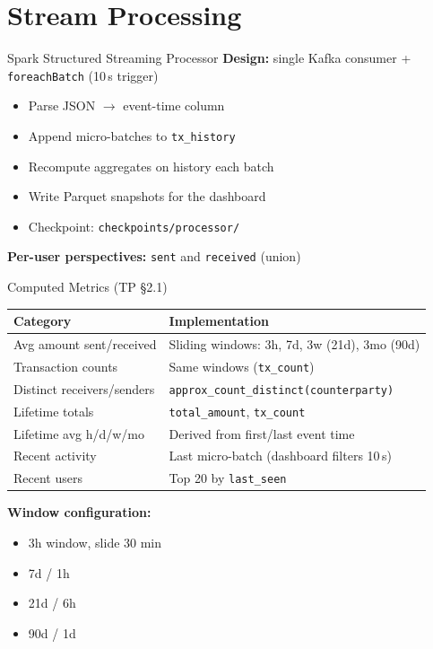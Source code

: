 \documentclass[aspectratio=169,11pt]{beamer}
\begin{document}
\section{Stream Processing}

\begin{frame}{Spark Structured Streaming Processor}
  \textbf{Design:} single Kafka consumer + \texttt{foreachBatch} (10\,s trigger)
  \begin{itemize}
    \item Parse JSON $\rightarrow$ event-time column
    \item Append micro-batches to \texttt{tx\_history}
    \item Recompute aggregates on history each batch
    \item Write Parquet snapshots for the dashboard
    \item Checkpoint: \texttt{checkpoints/processor/}
  \end{itemize}
  \vspace{0.4em}
  \textbf{Per-user perspectives:} \texttt{sent} and \texttt{received} (union)
\end{frame}

\begin{frame}{Computed Metrics (TP §2.1)}
  \footnotesize
  \begin{table}
    \centering
    \begin{tabular}{@{}ll@{}}
      \toprule
      \textbf{Category} & \textbf{Implementation} \\
      \midrule
      Avg amount sent/received & Sliding windows: 3h, 7d, 3w (21d), 3mo (90d) \\
      Transaction counts & Same windows (\texttt{tx\_count}) \\
      Distinct receivers/senders & \texttt{approx\_count\_distinct(counterparty)} \\
      Lifetime totals & \texttt{total\_amount}, \texttt{tx\_count} \\
      Lifetime avg h/d/w/mo & Derived from first/last event time \\
      Recent activity & Last micro-batch (dashboard filters 10\,s) \\
      Recent users & Top 20 by \texttt{last\_seen} \\
      \bottomrule
    \end{tabular}
  \end{table}
  \vspace{0.3em}
  \normalsize
  \textbf{Window configuration:}
  \begin{itemize}
    \item 3h window, slide 30 min \quad
    \item 7d / 1h \quad
    \item 21d / 6h \quad
    \item 90d / 1d
  \end{itemize}
\end{frame}
\end{document}
